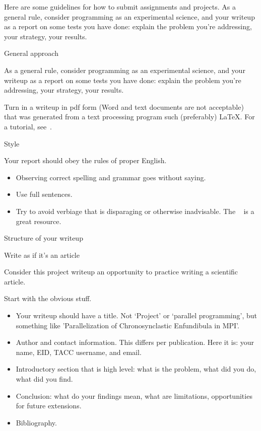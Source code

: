 
Here are some guidelines for how to submit assignments and projects.
As a general rule, consider programming as an experimental science,
and your writeup as a report on some tests you have done: explain
the problem you're addressing, your strategy, your results.

 {General approach}

As a general rule, consider programming as an experimental science,
and your writeup as a report on some tests you have done: explain
the problem you're addressing, your strategy, your results.

Turn in a writeup in pdf form (Word and text documents are not acceptable)
that was generated from a text processing program such 
(preferably) \LaTeX.
For a tutorial, see~.

 {Style}

Your report should obey the rules of proper English.
\begin{itemize}
\item Observing correct spelling and grammar goes without saying.
\item Use full sentences.
\item Try to avoid verbiage that is disparaging
  or otherwise inadvisable.
  The
  ~\cite{googlestyle}
  is a great resource.
\end{itemize}

 {Structure of your writeup}

 {Write as if it's an article}

Consider this project writeup an opportunity to practice writing a scientific article.

Start with the obvious stuff.
\begin{itemize}
\item Your writeup should have a title. Not `Project' or `parallel programming',
  but something like 'Parallelization of Chronosynclastic Enfundibula in MPI'.
\item Author and contact information. This differs per publication.
  Here it is: your name, EID, TACC username, and email.
\item Introductory section that is high level: what is the problem,
  what did you do, what did you find.
\item Conclusion: what do your findings mean, what are limitations, opportunities
  for future extensions.
\item Bibliography.
\end{itemize}


